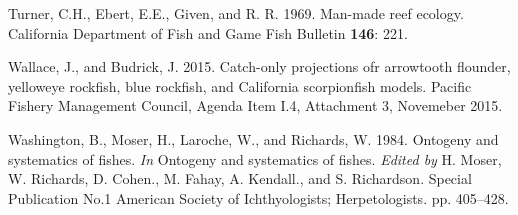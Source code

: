 \documentclass[12pt,]{article}
\begin{document}
\hypertarget{ref-Turner1969}{}
Turner, C.H., Ebert, E.E., Given, and R. R. 1969. Man-made reef ecology.
California Department of Fish and Game Fish Bulletin \textbf{146}: 221.

\hypertarget{ref-Wallace2015}{}
Wallace, J., and Budrick, J. 2015. Catch-only projections ofr arrowtooth
flounder, yelloweye rockfish, blue rockfish, and California scorpionfish
models. Pacific Fishery Management Council, Agenda Item I.4, Attachment
3, Novemeber 2015.

\hypertarget{ref-Washington1984}{}
Washington, B., Moser, H., Laroche, W., and Richards, W. 1984. Ontogeny
and systematics of fishes. \emph{In} Ontogeny and systematics of fishes.
\emph{Edited by} H. Moser, W. Richards, D. Cohen., M. Fahay, A.
Kendall., and S. Richardson. Special Publication No.1 American Society
of Ichthyologists; Herpetologists. pp. 405--428.
\end{document}
